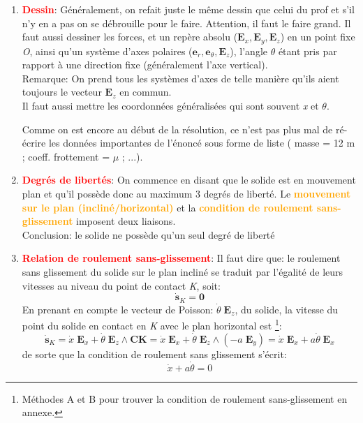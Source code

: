 \documentclass[a4paper]{article}
\begin{document}
\begin{enumerate}





\item \textcolor{red}{\textbf{Dessin}}: Généralement, on refait juste le même dessin que celui du prof et s'il n'y en a pas on se débrouille pour le faire. Attention, il faut le faire grand. Il faut aussi dessiner les forces, et un repère absolu ($ \textbf{E}_x, \textbf{E}_y, \textbf{E}_z $) en un point fixe \emph{O}, ainsi qu'un système d'axes polaires ($ \textbf{e}_r, \textbf{e}_\theta, \textbf{E}_z $), l'angle $ \theta $ étant pris par rapport à une direction fixe (généralement l'axe vertical). \\
Remarque: On prend tous les systèmes d'axes de telle manière qu'ils aient toujours le vecteur $ \textbf{E}_z $ en commun. \\
Il faut aussi mettre les coordonnées généralisées qui sont souvent \emph{x} et $ \theta $.

Comme on est encore au début de la résolution, ce n'est pas plus mal de ré-écrire les données importantes de l'énoncé sous forme de liste (\textbullet \; masse = 12 m ; \textbullet \; coeff. frottement = $ \mu $ ; ...).





\item \textcolor{red}{\textbf{Degrés de libertés}}: On commence en disant que le solide est en mouvement plan et qu'il possède donc au maximum 3 degrés de liberté. Le \textcolor{orange}{\textbf{mouvement sur le plan (incliné/horizontal)}} et la \textcolor{orange}{\textbf{condition de roulement sans-glissement}} imposent deux liaisons. \\
Conclusion: le solide ne possède qu'un seul degré de liberté





\item \textcolor{red}{\textbf{Relation de roulement sans-glissement}}: Il faut dire que: le roulement sans glissement du solide sur le plan incliné se traduit par l’égalité de leurs vitesses au
niveau du point de contact \emph{K}, soit:
\[ \dot{\textbf{s}}_K = \textbf{0} \]
En prenant en compte le vecteur de Poisson: $ \dot{\theta} \; \textbf{E}_z $, du solide, la vitesse du point du solide en contact en \emph{K} avec le plan horizontal est \textbf{}\footnote{Méthodes A et B pour trouver la condition de roulement sans-glissement en annexe.}:
\[ \dot{\textbf{s}}_K = \dot{x} \; \textbf{E}_x + \dot{\theta} \; \textbf{E}_z \wedge \textbf{CK} = \dot{x} \; \textbf{E}_x + \dot{\theta} \; \textbf{E}_z \wedge (- a \; \textbf{E}_y) = \dot{x} \; \textbf{E}_x + a \dot{\theta} \; \textbf{E}_x \]
de sorte que la condition de roulement sans glissement s’écrit:
\[ \dot{x} + a \dot{\theta} = 0 \]






\end{enumerate}
\end{document}

